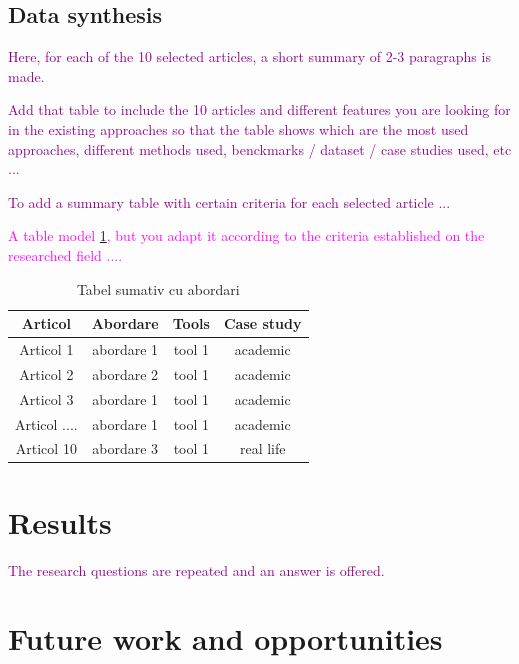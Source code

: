 \documentclass[a4paper,fleqn]{cas-dc}
\begin{document}
\subsection{Data synthesis}
\label{SectiuneSintezaArticole}

\textcolor{darkmagenta}{Here, for each of the 10 selected articles, a short summary of 2-3 paragraphs is made.} 


\textcolor{darkmagenta}{Add that table to include the 10 articles and different features you are looking for in the existing approaches so that the table shows which are the most used approaches, different methods used, benckmarks / dataset / case studies used, etc ... } 


\textcolor{darkmagenta}{To add a summary table with certain criteria for each selected article ...} 

\textcolor{magenta}{A table model \ref{TabelSumativ}, but you adapt it according to the criteria established on the researched field ....}

\begin{table}[htbp]
\begin{center}
    \begin{tabular}{ |c|c|c|c| } 
    \hline
    \textbf{Articol} & \textbf{Abordare} & \textbf{Tools} & \textbf{Case study}\\
    \hline
    Articol 1 & abordare 1  & tool 1  & academic\\
      \hline
    Articol 2 & abordare 2 & tool 1  & academic\\
      \hline
    Articol 3 & abordare 1 & tool 1  & academic\\
      \hline
    Articol .... & abordare 1 & tool 1  & academic\\
      \hline
    Articol 10 & abordare 3 & tool 1  & real life\\
    \hline
    \end{tabular}
    \end{center}
    \caption{ Tabel sumativ cu abordari }
    \label{TabelSumativ}
\end{table}    

\section{Results}

\textcolor{darkmagenta}{The research questions are repeated and an answer is offered.}

\section{Future work and opportunities}
\end{document}
